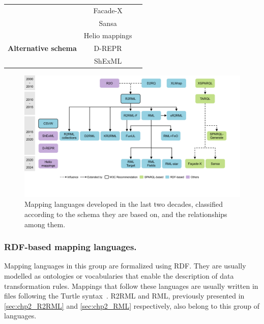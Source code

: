 \begin{table}[t]
{\begin{tabular}{ccc}
                              & Facade-X        & \parencite{asprino2023sparql-anything,sparqlanything}\\ \cmidrule{2-3}
                              & Sansa            & \parencite{stadler2023spark}\\ \midrule
\multirow{4}{*}{\textbf{Alternative schema}}       & Helio mappings  & \parencite{cimmino2022helio}\\ \cmidrule{2-3} 
                              & D-REPR          & \parencite{Vu2019d-repr}\\ \cmidrule{2-3} 
                              & ShExML          & \parencite{Garcia-Gonzalez2020shexml,shexml}\\  \bottomrule
\end{tabular}}
\end{table}



\begin{figure}[t]
\centering
\includegraphics[width=1\linewidth]{figures/chp2_mapping_languages}
\caption[Existing mapping languages and the relationships among them]{Mapping languages developed in the last two decades, classified according to the schema they are based on, and the relationships among them.}
\label{fig:chp2_mapping_languages}
\end{figure}

\subsubsection{RDF-based mapping languages.} 
\label{sec:chp2_RDF-languages}

Mapping languages in this group are formalized using RDF. They are usually modelled as ontologies or vocabularies that enable the description of data transformation rules. Mappings that follow these languages are usually written in files following the Turtle syntax~\parencite{turtle}. R2RML and RML, previously presented in \cref{sec:chp2_R2RML}
and \cref{sec:chp2_RML} respectively, also belong to this group of languages. 


